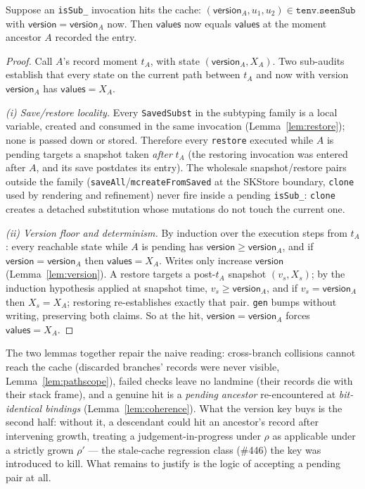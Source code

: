 \documentclass[11pt]{article}
\newcommand{\vals}{\mathsf{values}}
\newcommand{\ver}{\mathsf{version}}
\begin{document}
\begin{lemma}
\label{lem:coherence}
Suppose an \texttt{isSub\_} invocation hits the cache:
$(\ver_A, u_1, u_2) \in \texttt{tenv.seenSub}$ with $\ver = \ver_A$ now.
Then $\vals$ now equals $\vals$ at the moment ancestor $A$ recorded the
entry.
\end{lemma}
\begin{proof}
Call $A$'s record moment $t_A$, with state $(\ver_A, X_A)$. Two
sub-audits establish that every state on the current path between $t_A$
and now with version $\ver_A$ has $\vals = X_A$.

\emph{(i) Save/restore locality.} Every \texttt{SavedSubst} in the
subtyping family is a local variable, created and consumed in the same
invocation (Lemma~\ref{lem:restore}); none is passed down or stored.
Therefore every \texttt{restore} executed while $A$ is pending targets a
snapshot taken \emph{after} $t_A$ (the restoring invocation was entered
after $A$, and its save postdates its entry). The wholesale
snapshot/restore pairs outside the family
(\texttt{saveAll}/\texttt{mcreateFromSaved} at the SKStore boundary,
\texttt{clone} used by rendering and refinement) never fire inside a
pending \texttt{isSub\_}: \texttt{clone} creates a detached substitution
whose mutations do not touch the current one.

\emph{(ii) Version floor and determinism.} By induction over the
execution steps from $t_A$: every reachable state while $A$ is pending
has $\ver \geq \ver_A$, and if $\ver = \ver_A$ then $\vals = X_A$.
Writes only increase $\ver$ (Lemma~\ref{lem:version}). A restore targets
a post-$t_A$ snapshot $(v_s, X_s)$; by the induction hypothesis applied
at snapshot time, $v_s \geq \ver_A$, and if $v_s = \ver_A$ then
$X_s = X_A$; restoring re-establishes exactly that pair. \texttt{gen}
bumps without writing, preserving both claims. So at the hit,
$\ver = \ver_A$ forces $\vals = X_A$.
\end{proof}

\noindent
The two lemmas together repair the naive reading: cross-branch collisions
cannot reach the cache (discarded branches' records were never visible,
Lemma~\ref{lem:pathscope}), failed checks leave no landmine (their records
die with their stack frame), and a genuine hit is a \emph{pending
ancestor} re-encountered at \emph{bit-identical bindings}
(Lemma~\ref{lem:coherence}). What the version key buys is the second
half: without it, a descendant could hit an ancestor's record after
intervening growth, treating a judgement-in-progress under $\rho$ as
applicable under a strictly grown $\rho'$ --- the stale-cache regression
class (\#446) the key was introduced to kill. What remains to justify is
the logic of accepting a pending pair at all.
\end{document}
